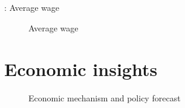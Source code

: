 \begin{frame}{\insertsection: Average wage}
  \begin{figure}
  \caption{Average wage}
  \end{figure}
\end{frame}
\section{Economic insights}
\begin{frame}{\insertsection}
  \begin{figure}[h!]\centering
  \hspace{0.5cm}
  \caption{Economic mechanism and policy forecast}\label{Economic mechanism and policy forecast}
  \end{figure}
\end{frame}
